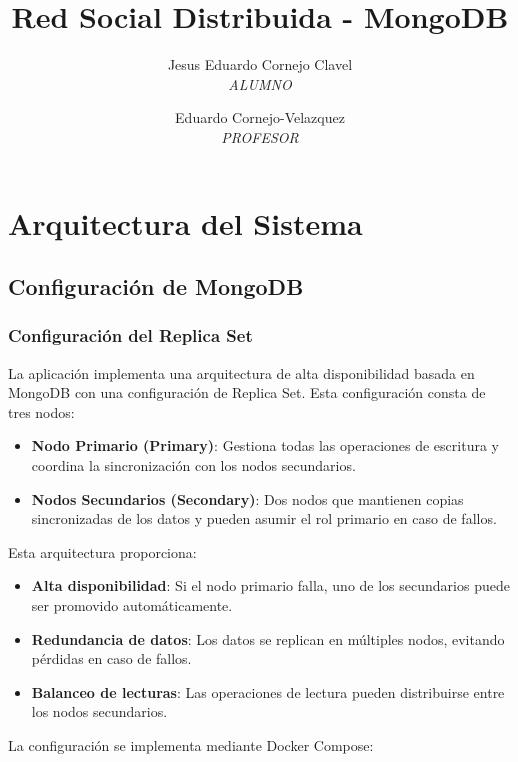 \documentclass[12pt,letterpaper]{article}
\title{\LARGE \textbf{Red Social Distribuida - MongoDB}}
\author{
    Jesus Eduardo Cornejo Clavel \\
    \textit{ALUMNO} 
    \and
    Eduardo Cornejo-Velazquez \\
    \textit{PROFESOR} 
}
\begin{document}
\maketitle
\tableofcontents
\newpage

\section{Arquitectura del Sistema}
\subsection{Configuración de MongoDB}
\subsubsection{Configuración del Replica Set}
La aplicación implementa una arquitectura de alta disponibilidad basada en MongoDB con una configuración de Replica Set. Esta configuración consta de tres nodos:

\begin{itemize}
    \item \textbf{Nodo Primario (Primary)}: Gestiona todas las operaciones de escritura y coordina la sincronización con los nodos secundarios.
    \item \textbf{Nodos Secundarios (Secondary)}: Dos nodos que mantienen copias sincronizadas de los datos y pueden asumir el rol primario en caso de fallos.
\end{itemize}

Esta arquitectura proporciona:
\begin{itemize}
    \item \textbf{Alta disponibilidad}: Si el nodo primario falla, uno de los secundarios puede ser promovido automáticamente.
    \item \textbf{Redundancia de datos}: Los datos se replican en múltiples nodos, evitando pérdidas en caso de fallos.
    \item \textbf{Balanceo de lecturas}: Las operaciones de lectura pueden distribuirse entre los nodos secundarios.
\end{itemize}

La configuración se implementa mediante Docker Compose:
\end{document}
